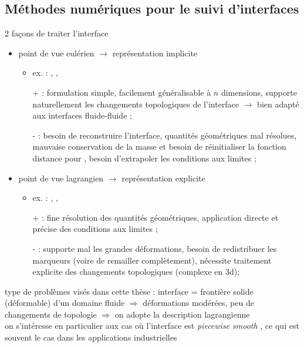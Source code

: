 \subsection*{Méthodes numériques pour le suivi d'interfaces}
2 façons de traiter l'interface
\begin{itemize}
	\item point de vue eulérien $\to$ représentation implicite
	\begin{itemize}
		\item ex. :  \cite{sethian1999},  \cite{gueyffier1999}, \etc
		\item[+] : formulation simple, facilement généralisable à $n$ dimensions, supporte naturellement les changements topologiques de l'interface $\to$ bien adapté aux interfaces fluide-fluide ;
		\item[-] : besoin de reconstruire l'interface, quantités géométriques mal résolues, mauvaise conservation de la masse et besoin de réinitialiser la fonction distance pour , besoin d'extrapoler les conditions aux limites ;
	\end{itemize}
	
	\item point de vue lagrangien $\to$ représentation explicite
	\begin{itemize}
		\item ex. :  \cite{popinet1999, tryggvason2001},  \cite{jiao2007}, \etc
		\item[+] : fine résolution des quantités géométriques, application directe et précise des conditions aux limites ;
		\item[-] : supporte mal les grandes déformations, besoin de redistribuer les marqueurs (voire de remailler complètement), nécessite traitement explicite des changements topologiques (complexe en 3d);
	\end{itemize}
\end{itemize}

\bigskip
type de problèmes visés dans cette thèse : interface = frontière solide (déformable) d'un domaine fluide $\Rightarrow$ déformations modérées, peu de changements de topologie $\Rightarrow$ on adopte la description lagrangienne\\
on s'intéresse en particulier aux cas où l'interface est \emph{piecewise smooth}%
, ce qui est souvent le cas dans les applications industrielles\\

